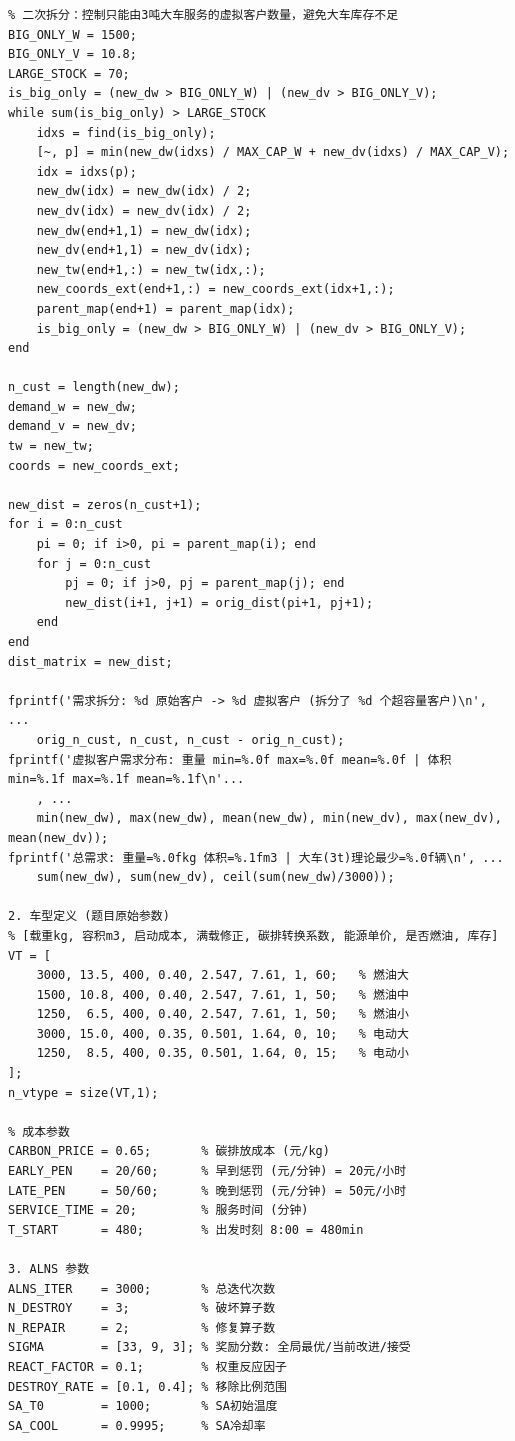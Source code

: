 {\begin{verbatim}
% 二次拆分：控制只能由3吨大车服务的虚拟客户数量，避免大车库存不足
BIG_ONLY_W = 1500;
BIG_ONLY_V = 10.8;
LARGE_STOCK = 70;
is_big_only = (new_dw > BIG_ONLY_W) | (new_dv > BIG_ONLY_V);
while sum(is_big_only) > LARGE_STOCK
    idxs = find(is_big_only);
    [~, p] = min(new_dw(idxs) / MAX_CAP_W + new_dv(idxs) / MAX_CAP_V);
    idx = idxs(p);
    new_dw(idx) = new_dw(idx) / 2;
    new_dv(idx) = new_dv(idx) / 2;
    new_dw(end+1,1) = new_dw(idx);
    new_dv(end+1,1) = new_dv(idx);
    new_tw(end+1,:) = new_tw(idx,:);
    new_coords_ext(end+1,:) = new_coords_ext(idx+1,:);
    parent_map(end+1) = parent_map(idx);
    is_big_only = (new_dw > BIG_ONLY_W) | (new_dv > BIG_ONLY_V);
end

n_cust = length(new_dw);
demand_w = new_dw;
demand_v = new_dv;
tw = new_tw;
coords = new_coords_ext;

new_dist = zeros(n_cust+1);
for i = 0:n_cust
    pi = 0; if i>0, pi = parent_map(i); end
    for j = 0:n_cust
        pj = 0; if j>0, pj = parent_map(j); end
        new_dist(i+1, j+1) = orig_dist(pi+1, pj+1);
    end
end
dist_matrix = new_dist;

fprintf('需求拆分: %d 原始客户 -> %d 虚拟客户 (拆分了 %d 个超容量客户)\n', ...
    orig_n_cust, n_cust, n_cust - orig_n_cust);
fprintf('虚拟客户需求分布: 重量 min=%.0f max=%.0f mean=%.0f | 体积 min=%.1f max=%.1f mean=%.1f\n'...
    , ...
    min(new_dw), max(new_dw), mean(new_dw), min(new_dv), max(new_dv), mean(new_dv));
fprintf('总需求: 重量=%.0fkg 体积=%.1fm3 | 大车(3t)理论最少=%.0f辆\n', ...
    sum(new_dw), sum(new_dv), ceil(sum(new_dw)/3000));

2. 车型定义 (题目原始参数)
% [载重kg, 容积m3, 启动成本, 满载修正, 碳排转换系数, 能源单价, 是否燃油, 库存]
VT = [
    3000, 13.5, 400, 0.40, 2.547, 7.61, 1, 60;   % 燃油大
    1500, 10.8, 400, 0.40, 2.547, 7.61, 1, 50;   % 燃油中
    1250,  6.5, 400, 0.40, 2.547, 7.61, 1, 50;   % 燃油小
    3000, 15.0, 400, 0.35, 0.501, 1.64, 0, 10;   % 电动大
    1250,  8.5, 400, 0.35, 0.501, 1.64, 0, 15;   % 电动小
];
n_vtype = size(VT,1);

% 成本参数
CARBON_PRICE = 0.65;       % 碳排放成本 (元/kg)
EARLY_PEN    = 20/60;      % 早到惩罚 (元/分钟) = 20元/小时
LATE_PEN     = 50/60;      % 晚到惩罚 (元/分钟) = 50元/小时
SERVICE_TIME = 20;         % 服务时间 (分钟)
T_START      = 480;        % 出发时刻 8:00 = 480min

3. ALNS 参数
ALNS_ITER    = 3000;       % 总迭代次数
N_DESTROY    = 3;          % 破坏算子数
N_REPAIR     = 2;          % 修复算子数
SIGMA        = [33, 9, 3]; % 奖励分数: 全局最优/当前改进/接受
REACT_FACTOR = 0.1;        % 权重反应因子
DESTROY_RATE = [0.1, 0.4]; % 移除比例范围
SA_T0        = 1000;       % SA初始温度
SA_COOL      = 0.9995;     % SA冷却率


\end{verbatim}}
